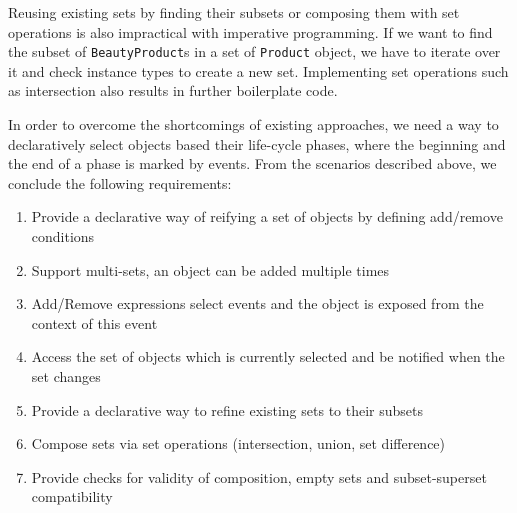 Reusing existing sets by finding their subsets or composing them with set operations is also impractical with imperative programming. If we want to find the subset of \texttt{BeautyProduct}s in a set of \texttt{Product} object, we have to iterate over it and check instance types to create a new set. Implementing set operations such as intersection also results in further boilerplate code.

In order to overcome the shortcomings of existing approaches, we need a way to declaratively select objects based their life-cycle phases, where the beginning and the end of a phase is marked by events. From the scenarios described above, we conclude the following requirements:

\begin{enumerate}[{Requirement}1{:}]
\item Provide a declarative way of reifying a set of objects by defining add/remove conditions
\item Support multi-sets, an object can be added multiple times
\item Add/Remove expressions select events and the object is exposed from the context of this event
\item Access the set of objects which is currently selected and be notified when the set changes
\item Provide a declarative way to refine existing sets to their subsets
\item Compose sets via set operations (intersection, union, set difference)
\item Provide checks for validity of composition, empty sets and subset-superset compatibility
\end{enumerate}
